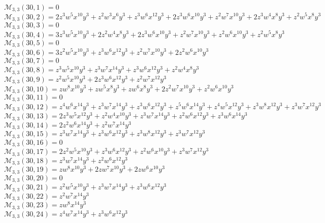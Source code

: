 \documentclass[12pt]{memoireuqam1.3}
\begin{document}
$\mathcal{M}_{3,3}(30,1)=0$\\
$\mathcal{M}_{3,3}(30,2)=2z^3w^5x^{10}y^3+z^2w^3x^6y^3+z^3w^6x^{12}y^3+2z^3w^6x^{10}y^3+z^2w^7x^{10}y^3+2z^3w^4x^8y^3+z^2w^5x^8y^3$\\
$\mathcal{M}_{3,3}(30,3)=0$\\
$\mathcal{M}_{3,3}(30,4)=3z^3w^5x^{10}y^3+2z^2w^4x^8y^3+2z^3w^6x^{10}y^3+z^2w^7x^{10}y^3+z^2w^6x^{10}y^3+z^2w^5x^8y^3$\\
$\mathcal{M}_{3,3}(30,5)=0$\\
$\mathcal{M}_{3,3}(30,6)=3z^2w^5x^{10}y^3+z^3w^6x^{12}y^3+z^2w^7x^{10}y^3+2z^2w^6x^{10}y^3$\\
$\mathcal{M}_{3,3}(30,7)=0$\\
$\mathcal{M}_{3,3}(30,8)=z^3w^5x^{10}y^3+z^3w^7x^{14}y^3+z^3w^6x^{12}y^3+z^2w^4x^8y^3$\\
$\mathcal{M}_{3,3}(30,9)=z^2w^5x^{10}y^3+2z^3w^6x^{12}y^3+z^2w^7x^{12}y^3$\\
$\mathcal{M}_{3,3}(30,10)=zw^8x^{10}y^3+zw^5x^8y^3+zw^6x^8y^3+2z^2w^7x^{10}y^3+z^2w^6x^{10}y^3$\\
$\mathcal{M}_{3,3}(30,11)=0$\\
$\mathcal{M}_{3,3}(30,12)=z^4w^6x^{14}y^3+z^3w^7x^{14}y^3+z^3w^6x^{12}y^3+z^5w^6x^{14}y^3+z^4w^5x^{12}y^3+z^3w^8x^{12}y^3+z^3w^7x^{12}y^3$\\
$\mathcal{M}_{3,3}(30,13)=2z^3w^5x^{12}y^3+z^2w^4x^{10}y^3+z^3w^7x^{14}y^3+z^2w^6x^{12}y^3+z^3w^6x^{14}y^3$\\
$\mathcal{M}_{3,3}(30,14)=2z^2w^6x^{14}y^3+z^2w^7x^{14}y^3$\\
$\mathcal{M}_{3,3}(30,15)=z^3w^7x^{14}y^3+z^3w^6x^{12}y^3+z^3w^8x^{12}y^3+z^3w^7x^{12}y^3$\\
$\mathcal{M}_{3,3}(30,16)=0$\\
$\mathcal{M}_{3,3}(30,17)=2z^2w^5x^{10}y^3+z^3w^6x^{12}y^3+z^2w^6x^{10}y^3+z^3w^7x^{12}y^3$\\
$\mathcal{M}_{3,3}(30,18)=z^3w^7x^{14}y^3+z^2w^6x^{12}y^3$\\
$\mathcal{M}_{3,3}(30,19)=zw^8x^{10}y^3+2zw^7x^{10}y^3+2zw^6x^{10}y^3$\\
$\mathcal{M}_{3,3}(30,20)=0$\\
$\mathcal{M}_{3,3}(30,21)=z^2w^5x^{10}y^3+z^3w^7x^{14}y^3+z^3w^6x^{12}y^3$\\
$\mathcal{M}_{3,3}(30,22)=z^2w^7x^{14}y^3$\\
$\mathcal{M}_{3,3}(30,23)=zw^8x^{14}y^3$\\
$\mathcal{M}_{3,3}(30,24)=z^4w^7x^{14}y^3+z^3w^6x^{12}y^3$\\
\end{document}
